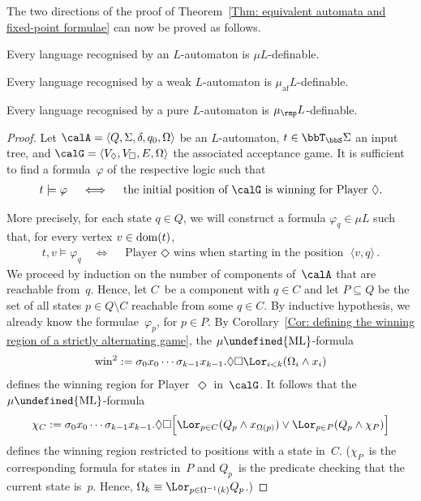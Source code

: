 \documentclass[10pt, fleqn]{scrartcl}
\makeatletter
\newcommand\m@thsm@ller[2]{\mbox{\relscale{0.91}$\m@th#1#2$}}
\let\smaller\undefined
\DeclareRobustCommand\smaller[1]{\relax\ifmmode{\mathpalette\m@thsm@ller{#1}}\else{\relscale{0.91}#1}\fi}
\DeclareRobustCommand*{\dom}{\qopname\relax o{dom}}
\newcommand*{\ML}{\smaller{\mathrm{ML}}}
\newcommand*{\muaf}{\mu_{\mathrm{af}}}
\newcommand*{\mup}{\mu_\rmp}
\newcommand*{\?}{\kern .08em}
\makeatother
\begin{document}
The two directions of the proof of
Theorem~\ref{Thm: equivalent automata and fixed-point formulae}
can now be proved as follows.
\begin{Prop}\label{Prop: automaton -> formula}\leavevmode
\begin{enuma}
\item Every language recognised by an $L$-automaton is $\mu L$-definable.
\item Every language recognised by a weak $L$-automaton is $\muaf L$-definable.
\item Every language recognised by a pure $L$-automaton is $\mup L$-definable.
\end{enuma}
\end{Prop}
\begin{proof}
Let $\calA = \langle Q,\Sigma,\delta,q_0,\Omega\rangle$ be an $L$-automaton,
$t \in \bbT_\bbS\Sigma$ an input tree, and $\calG = \langle V_\Diamond,V_\Box,E,\Omega\rangle$
the associated acceptance game.
It is sufficient to find a formula~$\varphi$ of the respective logic such that
\begin{align*}
  t \models \varphi \quad\iff\quad
  \text{the initial position of } \calG \text{ is winning for Player~$\Diamond$.}
\end{align*}

More precisely, for each state $q \in Q$, we will construct a formula $\varphi_q \in \mu L$
such that, for every vertex $v \in \dom(t)$,
\begin{align*}
  t,v \models \varphi_q
  \quad\iff\quad
  \text{Player~$\Diamond$ wins when starting in the position } \langle v,q\rangle\,.
\end{align*}
We proceed by induction on the number of components of~$\calA$ that are reachable from~$q$.
Hence, let $C$~be a component with $q \in C$ and let $P \subseteq Q$
be the set of all states $p \in Q \setminus C$ reachable from some $q \in C$.
By inductive hypothesis, we already know the formulae~$\varphi_p$, for $p \in P$.
By Corollary~\ref{Cor: defining the winning region of a strictly alternating game},
the $\mu\ML$-formula
\begin{align*}
  \mathrm{win}^2 := \sigma_0x_0\cdots\sigma_{k-1}x_{k-1}.
                      {\Diamond}{\Box} \Lor_{i<k}(\Omega_i \land x_i)
\end{align*}
defines the winning region for Player~$\Diamond$ in~$\calG$.
It follows that the $\mu\ML$-formula
\begin{align*}
  \chi_C := \sigma_0x_0\cdots\sigma_{k-1}x_{k-1}.
               {\Diamond}{\Box}
                 \Bigl[\Lor_{p \in C}(Q_p \land x_{\Omega(p)}) \lor
                         \Lor_{p \in P} (Q_p \land \chi_P)\Bigr]
\end{align*}
defines the winning region restricted to positions with a state in~$C$.
($\chi_P$~is the corresponding formula for states in~$P$ and $Q_p$~is the predicate checking
that the current state is~$p$. Hence, $\Omega_k \equiv \Lor_{p \in \Omega^{-1}(k)} Q_p$.)


\end{proof}
\end{document}
